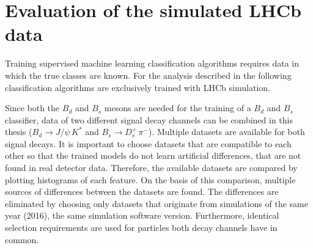 \section{Evaluation of the simulated LHCb data}

Training supervised machine learning classification algorithms requires data in which the true classes are known.
For the analysis described in the following classification algorithms are exclusively trained with LHCb simulation.

Since both the $B_d$ and $B_s$ mesons are needed for the training of a $B_d$ and $B_s$ classifier, data of two different signal decay channels can be combined in this thesis ($B_d \rightarrow J/\psi \, K^*$ and $B_s \rightarrow D^+_s \, \pi^-$). 
Multiple datasets are available for both signal decays.
It is important to choose datasets that are compatible to each other so that the trained models do not learn artificial differences, that are not found in real detector data.
Therefore, the available datasets are compared by plotting histograms of each feature.
On the basis of this comparison, multiple sources of differences between the datasets are found.
The differences are eliminated by choosing only datasets that originate from simulations of the same year (2016), the same simulation software version. 
Furthermore, identical selection requirements are used for particles both decay channels have in common.




